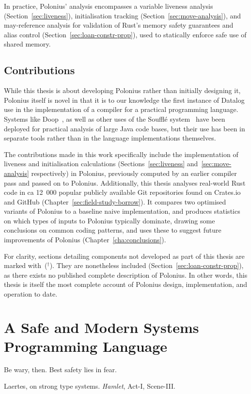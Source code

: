 \documentclass[11pt,a4paper,twoside,openany,draft]{report}
\newcommand{\notmine}[0] {$^\dagger$}
\begin{document}
In practice, Polonius' analysis encompasses a variable liveness analysis
(Section~\ref{sec:liveness}), initialisation tracking
(Section~\ref{sec:move-analysis}), and may-reference analysis for validation
of Rust's memory safety guarantees and alias control
(Section~\ref{sec:loan-constr-prop}), used to statically enforce safe use of
shared memory.

\section{Contributions}\label{sec:contributions}

While this thesis is about developing Polonius rather than initially designing
it, Polonius itself is novel in that it is to our knowledge the first instance
of Datalog use in the implementation of a compiler for a practical programming
language. Systems like Doop~\cite{bravenboer_strictly_2009}, as well as other
uses of the Souffl{\'e} system~\cite{souffle} have been deployed for practical
analysis of large Java code bases, but their use has been in separate tools
rather than in the language implementations themselves.

The contributions made in this work specifically include the implementation of
liveness and initialisation calculations (Sections~\ref{sec:liveness}
and~\ref{sec:move-analysis} respectively) in Polonius, previously computed by an
earlier compiler pass and passed on to Polonius. Additionally, this thesis
analyses real-world Rust code in ca 12~000 popular publicly available Git
repositories found on Crates.io and GitHub
(Chapter~\ref{sec:field-study-borrow}). It compares two optimised variants of
Polonius to a baseline naive implementation, and produces statistics on which
types of inputs to Polonius typically dominate, drawing some conclusions on
common coding patterns, and uses these to suggest future improvements of
Polonius (Chapter~\ref{cha:conclusions}).

For clarity, sections detailing components not developed as part of this thesis
are marked with~(\notmine{}). They are nonetheless included
(Section~\ref{sec:loan-constr-prop}), as there exists no published complete
description of Polonius. In other words, this thesis is itself the most complete
account of Polonius design, implementation, and operation to date.

\chapter{A Safe and Modern Systems Programming Language}\label{cha:background}
\epigraph{Be wary, then. Best safety lies in fear.}%
{Laertes, on strong type systems. \textit{Hamlet}, Act-I, Scene-III.}
\end{document}
